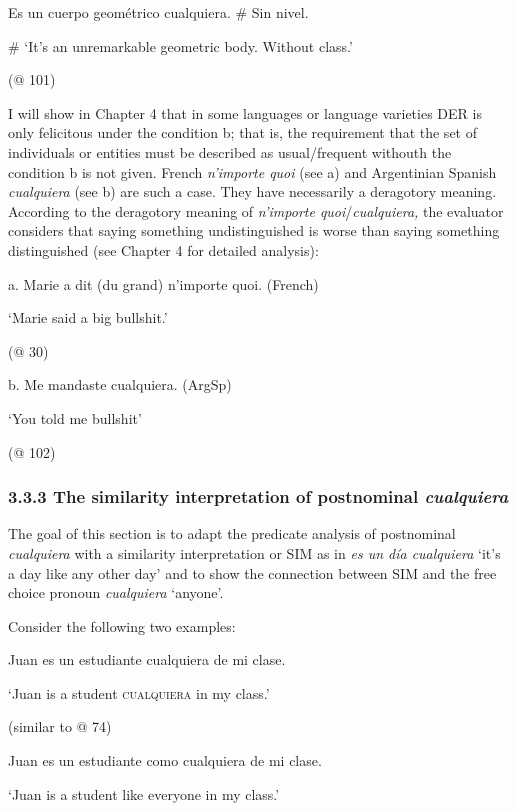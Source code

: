 \documentclass[output=paper]{langscibook}
\begin{document}
  Es un cuerpo geométrico cualquiera. \# Sin nivel.

  \# ‘It’s an unremarkable geometric body. Without class.’

  (@ 101)

I will show in Chapter 4 that in some languages or language varieties DER is only felicitous under the condition b; that is, the requirement that the set of individuals or entities must be described as usual/frequent withouth the condition b is not given. French \textit{n’importe quoi} (see a) and Argentinian Spanish \textit{cualquiera} (see b) are such a case. They have necessarily a deragotory meaning. According to the deragotory meaning of \textit{n’importe quoi}/\textit{cualquiera,} the evaluator considers that saying something undistinguished is worse than saying something distinguished (see Chapter 4 for detailed analysis):

\label{bkm:Ref72355051}  a.  Marie a dit (du grand) n’importe quoi.  (French)

    ‘Marie said a big bullshit.’  

      (@ 30)

  b.  Me mandaste cualquiera.  (ArgSp)

    ‘You told me bullshit’  

    (@ 102)

\subsubsection{\textbf{3.3.3} \textbf{The} \textbf{similarity} \textbf{interpretation} \textbf{of} \textbf{postnominal} \textbf{\textit{cualquiera}}}

The goal of this section is to adapt the predicate analysis of postnominal \textit{cualquiera} with a similarity interpretation or SIM as in \textit{es un día cualquiera} ‘it’s a day like any other day’ and to show the connection between SIM and the free choice pronoun \textit{cualquiera} ‘anyone’.   

  Consider the following two examples:

\label{bkm:Ref72353992}  Juan es un estudiante cualquiera de mi clase.

  ‘Juan is a student \textsc{cualquiera} in my class.’

  (similar to @ 74)

\label{bkm:Ref72354006}  Juan es un estudiante como cualquiera de mi clase.

  ‘Juan is a student like everyone in my class.’
\end{document}
